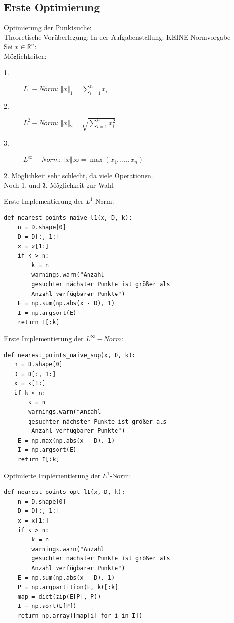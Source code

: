 \documentclass{beamer}
\begin{document}
\subsection{Erste Optimierung}

\begin{frame}[fragile]
Optimierung der Punktsuche:\\
Theoretische Vorüberlegung:
In der Aufgabenstellung: KEINE Normvorgabe\\
Sei $ x \in \mathbb{R} ^n$:\\
Möglichkeiten:
\begin{description}
\item[1.] $L^1-Norm$: $\Vert x\Vert _{1}= \sum_{i=1}^n x_i $
\item[2.] $L^2-Norm$:  $\Vert x\Vert _{2}=\sqrt{ \sum_{i=1}^n x_i ^2} $
\item[3.] $L^{\infty}-Norm$:  $\Vert x\Vert {\infty}= \max(x_1,....,x_n)$
\end{description}
2. Möglichkeit sehr schlecht, da viele Operationen.\\
Noch 1. und 3. Möglichkeit zur Wahl
\end{frame}


\begin{frame}[fragile]
Erste Implementierung der $L^1$-Norm:
\begin{verbatim}
def nearest_points_naive_l1(x, D, k):
    n = D.shape[0]
    D = D[:, 1:]
    x = x[1:]
    if k > n:
        k = n  
        warnings.warn("Anzahl
        gesuchter nächster Punkte ist größer als
        Anzahl verfügbarer Punkte")
    E = np.sum(np.abs(x - D), 1)
    I = np.argsort(E)
    return I[:k]
\end{verbatim}
\end{frame}



\begin{frame}[fragile]
Erste Implementierung der $L^{\infty}-Norm$:
\begin{verbatim}
def nearest_points_naive_sup(x, D, k):
   n = D.shape[0]
   D = D[:, 1:]
   x = x[1:]
   if k > n:
       k = n 
       warnings.warn("Anzahl
       gesuchter nächster Punkte ist größer als 
        Anzahl verfügbarer Punkte")
    E = np.max(np.abs(x - D), 1)
    I = np.argsort(E)
    return I[:k]
\end{verbatim} 
\end{frame}

\begin{frame}[fragile]
Optimierte Implementierung der $L^1$-Norm:
\begin{verbatim}
def nearest_points_opt_l1(x, D, k):
    n = D.shape[0]
    D = D[:, 1:]
    x = x[1:]
    if k > n:
        k = n  
        warnings.warn("Anzahl
        gesuchter nächster Punkte ist größer als
        Anzahl verfügbarer Punkte")
    E = np.sum(np.abs(x - D), 1)
    P = np.argpartition(E, k)[:k]
    map = dict(zip(E[P], P))
    I = np.sort(E[P])
    return np.array([map[i] for i in I])
\end{verbatim}
\end{frame}
\end{document}
